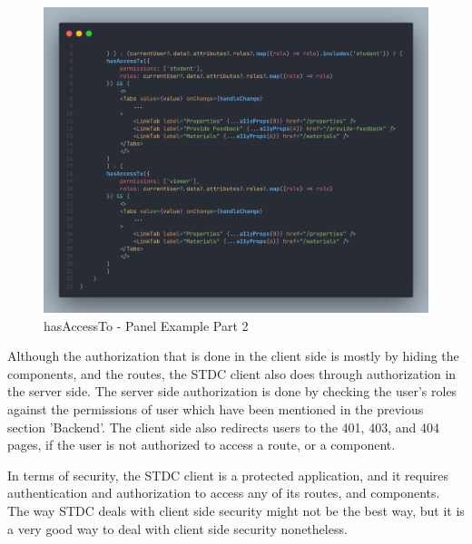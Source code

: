 \begin{justify}
        \begin{figure}[H]
            \centerline{\includegraphics[width=150mm,scale=1]{figures/implementation_and_testing/implementation/frontend/hasAccessTo-Panel-2.png}}
            \caption{hasAccessTo - Panel Example Part 2}
        \end{figure}

        \vspace{0.25cm}
        \newendline Although the authorization that is done in the client side is mostly by hiding the components, and the routes, the STDC client also does through authorization in the server side. The server side authorization is done by checking the user's roles against the permissions of user which have been mentioned in the previous section 'Backend'. The client side also redirects users to the 401, 403, and 404 pages, if the user is not authorized to access a route, or a component.

        \vspace{0.25cm}
        \newendline In terms of security, the STDC client is a protected application, and it requires authentication and authorization to access any of its routes, and components. The way STDC deals with client side security might not be the best way, but it is a very good way to deal with client side security nonetheless.

    \clearpage





\end{justify}
